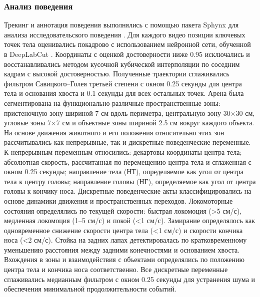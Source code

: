 \subsubsection{Анализ поведения}
\label{sec:behavioral_analysis}
Трекинг и аннотация поведения выполнялись с помощью пакета Sphynx для анализа исследовательского поведения \cite{Plusnin1}. Для каждого видео позиции ключевых точек тела оценивались покадрово с использованием нейронной сети, обученной в DeepLabCut \cite{Mathis}. Координаты с оценкой достоверности ниже 0.95 исключались и восстанавливались методом кусочной кубической интерполяции по соседним кадрам с высокой достоверностью. Полученные траектории сглаживались фильтром Савицкого--Голея третьей степени с окном 0.25 секунды для центра тела и основания хвоста и 0.1 секунды для всех остальных точек. Арена была сегментирована на функционально различные пространственные зоны: пристеночную зону шириной 7 см вдоль периметра, центральную зону 30$\times$30 см, угловые зоны 7$\times$7 см и объектные зоны шириной 2.5 см вокруг каждого объекта. На основе движения животного и его положения относительно этих зон рассчитывались как непрерывные, так и дискретные поведенческие переменные. К непрерывным переменным относились:
декартовы координаты центра тела;
абсолютная скорость, рассчитанная по перемещению центра тела и сглаженная с окном 0.25 секунды;
направление тела (НТ), определяемое как угол от центра тела к центру головы;
направление головы (НГ), определяемое как угол от центра головы к кончику носа.
Дискретные поведенческие акты классифицировались на основе динамики движения и пространственных переходов. Локомоторные состояния определялись по текущей скорости: быстрая локомоция (>5 см/с), медленная локомоция (1--5 см/с) и покой (<1 см/с). Замирание определялось как одновременное снижение скорости центра тела (<1 см/с) и скорости кончика носа (<2 см/с). Стойка на задних лапах детектировалась по кратковременному уменьшению расстояния между задними конечностями и основанием хвоста. Вхождения в зоны и взаимодействия с объектами определялись по положению центра тела и кончика носа соответственно. Все дискретные переменные сглаживались медианным фильтром с окном 0.25 секунды для устранения шума и обеспечения минимальной продолжительности событий.



